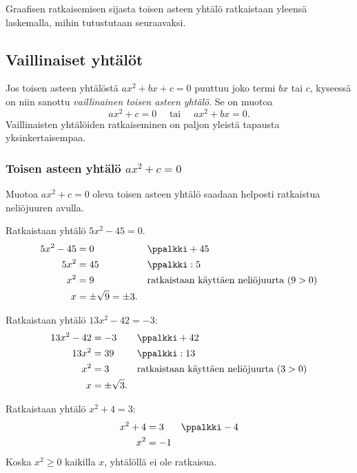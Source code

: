 Graafisen ratkaisemisen sijasta toisen asteen yhtälö ratkaistaan yleensä laskemalla, mihin tutustutaan seuraavaksi.

\subsection{Vaillinaiset yhtälöt}
Jos toisen asteen yhtälöstä $ax^2+bx+c=0$ puuttuu joko termi $bx$ tai $c$, kyseessä on niin sanottu \emph{vaillinainen toisen asteen yhtälö}. Se on muotoa
\[ax^2+c=0 \quad \text{ tai } \quad ax^2+bx=0.\]
Vaillinaisten yhtälöiden ratkaiseminen on paljon yleistä tapausta yksinkertaisempaa.

\subsubsection*{Toisen asteen yhtälö $ax^2+c=0$}
Muotoa $ax^2+c = 0$ oleva toisen asteen yhtälö saadaan helposti ratkaistua neliöjuuren avulla.

\begin{esimerkki}
Ratkaistaan yhtälö $5x^2-45=0$.
\begin{align*}
5x^2-45 &= 0 &&\ppalkki + 45 \\
5x^2 &= 45 &&\ppalkki : 5 \\
x^2 &= 9 &&\text{ratkaistaan käyttäen neliöjuurta ($9 > 0$)} \\
x &= \pm \sqrt{9} = \pm 3.
\end{align*}
\end{esimerkki}

\begin{esimerkki}
Ratkaistaan yhtälö $13x^2-42=-3$:
\begin{align*}
13x^2-42 &= -3 &&\ppalkki + 42 \\
13x^2 &= 39 &&\ppalkki : 13 \\
x^2 &= 3 &&\text{ratkaistaan käyttäen neliöjuurta ($3 > 0$)} \\
x &= \pm \sqrt{3}.
\end{align*}
\end{esimerkki}

\begin{esimerkki}
Ratkaistaan yhtälö $x^2+4=3$:
\begin{align*}
x^2+4 &= 3 &&\ppalkki - 4 \\
x^2 &= -1
\end{align*}
Koska $x^2 \geq 0$ kaikilla $x$, yhtälöllä ei ole ratkaisua.
\end{esimerkki}

